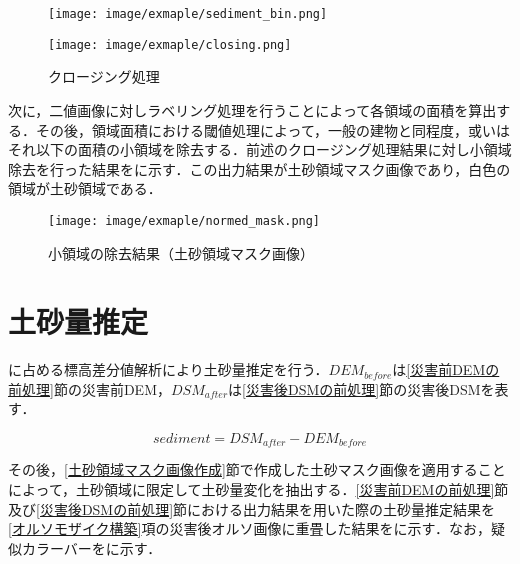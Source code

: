       \begin{figure}[tbp]
        \begin{minipage}[c]{0.5\hsize}
          \centering
          \texttt{[image: image/exmaple/sediment\_bin.png]}
        \end{minipage}
        \begin{minipage}[c]{0.45\hsize}
          \centering
          \texttt{[image: image/exmaple/closing.png]}
        \end{minipage}
        \caption{クロージング処理}
        \label{クロージング処理結果}
      \end{figure}

      次に，二値画像に対しラベリング処理を行うことによって各領域の面積を算出する．その後，領域面積における閾値処理によって，一般の建物と同程度，或いはそれ以下の面積の小領域を除去する．前述のクロージング処理結果に対し小領域除去を行った結果をに示す．この出力結果が土砂領域マスク画像であり，白色の領域が土砂領域である．
      
      \begin{figure}[tbp]
        \centering
        \texttt{[image: image/exmaple/normed\_mask.png]}
        \caption{小領域の除去結果（土砂領域マスク画像）}
        \label{小領域除去}
      \end{figure}



  \section{土砂量推定}
    \label{土砂量推定}
    に占める標高差分値解析により土砂量推定を行う．$DEM_{before}$は\ref{災害前DEMの前処理}節の災害前DEM，$DSM_{after}$は\ref{災害後DSMの前処理}節の災害後DSMを表す．
    
    \begin{equation}
      \label{土砂量推定式}
      sediment = DSM_{after} - DEM_{before}
    \end{equation}

    その後，\ref{土砂領域マスク画像作成}節で作成した土砂マスク画像を適用することによって，土砂領域に限定して土砂量変化を抽出する．\ref{災害前DEMの前処理}節及び\ref{災害後DSMの前処理}節における出力結果を用いた際の土砂量推定結果を\ref{オルソモザイク構築}項の災害後オルソ画像に重畳した結果をに示す．なお，疑似カラーバーをに示す．

